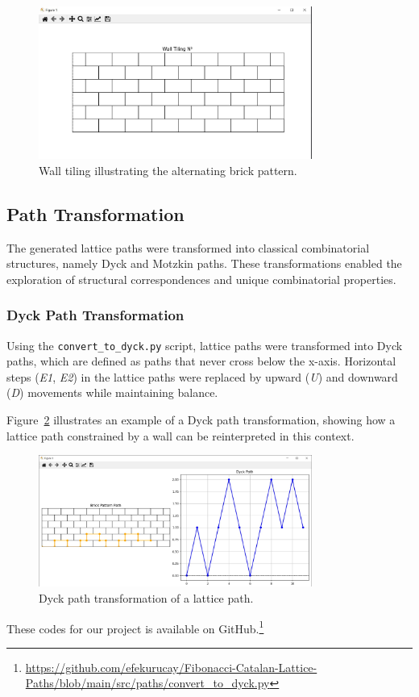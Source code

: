 \documentclass{article}
\begin{document}
\begin{figure}[h]
    \centering
    \includegraphics[width=0.8\textwidth]{images/walltilling.jpg}
    \caption{Wall tiling illustrating the alternating brick pattern.}
    \label{fig:wall_tiling}
\end{figure}


\subsection{Path Transformation}

The generated lattice paths were transformed into classical combinatorial structures, namely Dyck and Motzkin paths. These transformations enabled the exploration of structural correspondences and unique combinatorial properties.

\subsubsection{Dyck Path Transformation}
Using the \texttt{convert\_to\_dyck.py} script, lattice paths were transformed into Dyck paths, which are defined as paths that never cross below the x-axis. Horizontal steps (\textit{E1}, \textit{E2}) in the lattice paths were replaced by upward (\textit{U}) and downward (\textit{D}) movements while maintaining balance.

Figure~\ref{fig:dyck_path} illustrates an example of a Dyck path transformation, showing how a lattice path constrained by a wall can be reinterpreted in this context.

\begin{figure}[h]
    \centering
    \includegraphics[width=0.8\textwidth]{images/dyckpath.jpg}
    \caption{Dyck path transformation of a lattice path.}
    \label{fig:dyck_path}
\end{figure}
These codes for our project is available on GitHub.\footnote{\url{https://github.com/efekurucay/Fibonacci-Catalan-Lattice-Paths/blob/main/src/paths/convert_to_dyck.py}}
\end{document}
